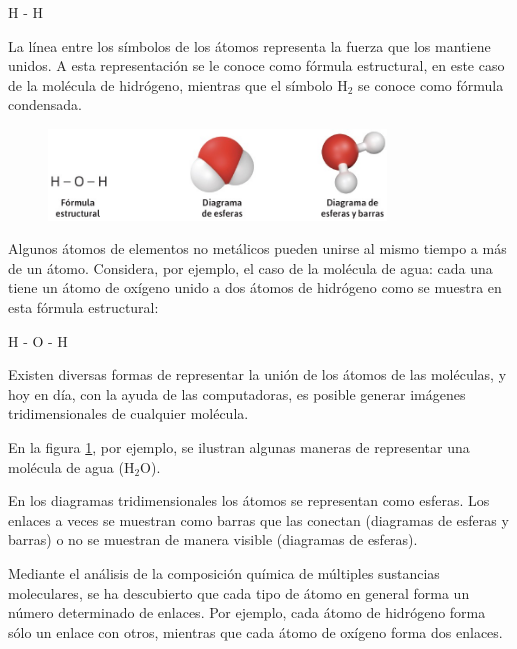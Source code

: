 \documentclass[11pt]{book}
\begin{document}
\begin{center}
  H - H
\end{center}

La línea entre los símbolos de los átomos representa la fuerza que los mantiene unidos.
A esta representación se le conoce como fórmula estructural, en este caso de la molécula
de hidrógeno, mientras que el símbolo H$_2$ se conoce como fórmula condensada.

\begin{figure}[H]
  \centering
  \includegraphics[width=0.8\textwidth]{esferas.jpg}
  \label{fig:esferas}
\end{figure}

Algunos átomos de elementos no metálicos pueden unirse al mismo tiempo a más de un átomo.
Considera, por ejemplo, el caso de la molécula de agua: cada una tiene un átomo de oxígeno
unido a dos átomos de hidrógeno como se muestra en esta fórmula estructural:

\begin{center}
  H - O - H
\end{center}

Existen diversas formas de representar la unión de los átomos de las moléculas, y hoy en día,
con la ayuda de las computadoras, es posible generar imágenes tridimensionales de cualquier
molécula.

En la figura \ref{fig:esferas}, por ejemplo,
se ilustran algunas maneras de representar una molécula de agua (H$_2$O).

En los diagramas tridimensionales los átomos se representan como esferas. Los enlaces a
veces se muestran como barras que las conectan (diagramas de esferas y barras) o no se muestran de manera visible (diagramas de esferas).

Mediante el análisis de la composición química de múltiples sustancias moleculares,
se ha descubierto que cada tipo de átomo en general forma un número determinado de enlaces.
Por ejemplo, cada átomo de hidrógeno forma sólo un enlace con otros, mientras que cada
átomo de oxígeno forma dos enlaces.
\end{document}
